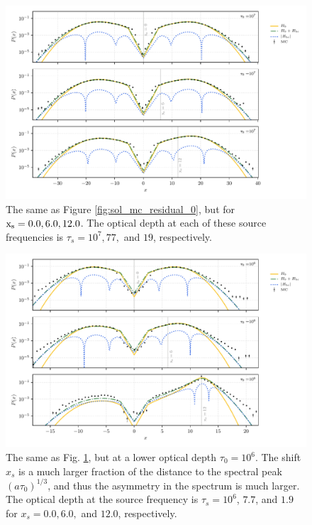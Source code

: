 \documentclass{aastex63}
\begin{document}
 \begin{figure}
    \centering
    \includegraphics{xinit_threepanel.pdf}
    \caption{The same as Figure \ref{fig:sol_mc_residual_0}, but for $\rm x_s = 0.0, 6.0, 12.0$. The optical depth at each of these source frequencies is $\tau_s = 10^7, 77,$ and $19$, respectively.} 
    \label{fig:sol_mc_xinit}
\end{figure}

 \begin{figure}
    \centering
    \includegraphics{xinit_threepanel_tau1e6.pdf}
    \caption{The same as Fig. \ref{fig:sol_mc_xinit}, but at a lower optical depth $\tau_0 = 10^6$. The shift $x_s$ is a much larger fraction of the distance to the spectral peak $(a\tau_0)^{1/3}$, and thus the asymmetry in the spectrum is much larger. The optical depth at the source frequency is $\tau_s = 10^6$, $7.7$, and $1.9$ for $x_s=0.0, 6.0,$ and $12.0$, respectively. } 
    \label{fig:sol_mc_xinit_lowtau}
\end{figure}
\end{document}
